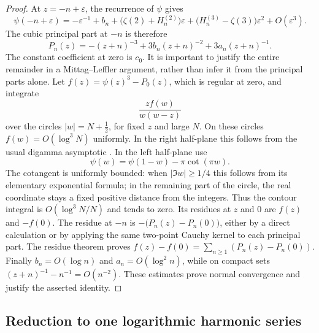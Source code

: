 \begin{proof}
At $z=-n+\varepsilon$, the recurrence of $\psi$ gives
\[
 \psi(-n+\varepsilon)
   =-\varepsilon^{-1}+b_n+
      \bigl(\zeta(2)+H_n^{(2)}\bigr)\varepsilon
      +\bigl(H_n^{(3)}-\zeta(3)\bigr)\varepsilon^2
      +O(\varepsilon^3).
\]
The cubic principal part at $-n$ is therefore
\[
 P_n(z)=-(z+n)^{-3}+3b_n(z+n)^{-2}+3a_n(z+n)^{-1}.
\]
The constant coefficient at zero is $c_0$.
It is important to justify the entire remainder in a Mittag--Leffler
argument, rather than infer it from the principal parts alone.
Let $f(z)=\psi(z)^3-P_0(z)$, which is regular at zero, and integrate
\[
 \frac{z f(w)}{w(w-z)}
\]
over the circles $|w|=N+\tfrac12$, for fixed $z$ and large $N$.
On these circles $f(w)=O(\log^3 N)$ uniformly.  In the right
half-plane this follows from the usual digamma asymptotic \cite[Sections~5.7, 5.11]{DLMFgamma}.  In the
left half-plane use
\[
 \psi(w)=\psi(1-w)-\pi\cot(\pi w).
\]
The cotangent is uniformly bounded: when $|\Im w|\ge1/4$ this follows
from its elementary exponential formula; in the remaining part of the
circle, the real coordinate stays a fixed positive distance from the
integers.  Thus the contour integral is
$O(\log^3 N/N)$ and tends to zero.
Its residues at $z$ and $0$ are $f(z)$ and $-f(0)$.
The residue at $-n$ is $-\bigl(P_n(z)-P_n(0)\bigr)$, either by a
direct calculation or by applying the same two-point Cauchy kernel to
each principal part.  The residue theorem proves
$f(z)-f(0)=\sum_{n\ge1}(P_n(z)-P_n(0))$.
Finally $b_n=O(\log n)$ and $a_n=O(\log^2 n)$, while on compact sets
$(z+n)^{-1}-n^{-1}=O(n^{-2})$.  These estimates prove normal
convergence and justify the asserted identity.
\end{proof}

\subsection{Reduction to one logarithmic harmonic series}


